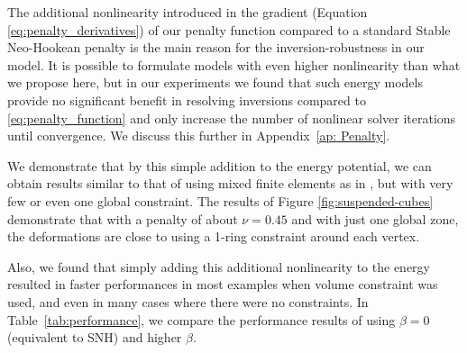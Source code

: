 The additional nonlinearity introduced in the gradient (Equation \eqref{eq:penalty_derivatives}) of our penalty function compared to a standard Stable Neo-Hookean penalty is the main reason for the inversion-robustness in our model. 
It is possible to formulate models with even higher nonlinearity than what we propose here, but in our
experiments we found that such energy models provide no significant benefit in resolving inversions
compared to \eqref{eq:penalty_function} and only increase the number of nonlinear solver iterations
until convergence. We discuss this further in Appendix~\ref{ap: Penalty}.

We demonstrate that by this simple addition to the energy potential, we can obtain results similar to 
that of using mixed finite elements as in \cite{Irving:2007}, but with very few or even 
one global constraint. The results of Figure  \ref{fig:suspended-cubes} demonstrate
that with a penalty of about $\nu = 0.45$ and with just one global zone, the deformations are close to 
using a 1-ring constraint around each vertex. 

Also, we found that simply adding this additional nonlinearity to the energy resulted in faster performances in most examples when volume constraint was used, and even in many cases where there were no constraints. 
In Table~\ref{tab:performance}, we compare the performance results of using $\beta = 0$ (equivalent to SNH) and higher $\beta$.